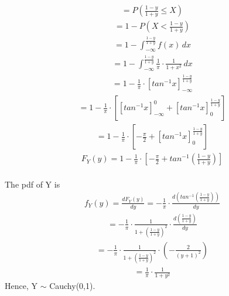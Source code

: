 \documentclass[journal,12pt,twocolumn]{IEEEtran}
\begin{document}
\begin{align}
    = P\left(\frac{1-y}{1+y} \leq X \right)
\end{align}
\begin{align}
    = 1 - P\left(X < \frac{1-y}{1+y}\right)
\end{align}
\begin{align}
    = 1 -  \int_{-\infty}^{\frac{1-y}{1+y}} f(x) \,dx
\end{align}
\begin{align}
    = 1 -  \int_{-\infty}^{\frac{1-y}{1+y}} \frac{1}{\pi}\cdot \frac{1}{1+x^2} \,dx
\end{align}
\begin{align}
    = 1 -  \frac{1}{\pi}\cdot \left[tan^{-1}x\right]_{-\infty}^{\frac{1-y}{1+y}}
\end{align}
\begin{align}
    = 1 -  \frac{1}{\pi}\cdot \left[\left[tan^{-1}x\right]_{-\infty}^{0}+\left[tan^{-1}x\right]_{0}^{\frac{1-y}{1+y}}\right]
\end{align}
\begin{align}
    = 1 -  \frac{1}{\pi}\cdot \left[-\frac{\pi}{2}+\left[tan^{-1}x\right]_{0}^{\frac{1-y}{1+y}}\right]
\end{align}
\begin{align}
    F_{Y}(y) = 1 -  \frac{1}{\pi}\cdot \left[-\frac{\pi}{2}+tan^{-1}\left({\frac{1-y}{1+y}}\right)\right]
\end{align} \\


The pdf of Y is
\begin{align}
    f_{Y}(y) = \frac{d F_{Y}(y)}{dy} = -\frac{1}{\pi}\cdot\frac{d\left(tan^{-1}\left({\frac{1-y}{1+y}}\right)\right)}{dy}
\end{align}
\begin{align}
    = -\frac{1}{\pi}\cdot\frac{1}{1+\left(\frac{1-y}{1+y}\right)^{2}}\cdot\frac{d\left({\frac{1-y}{1+y}}\right)}{dy}
\end{align}
\begin{align}
    = -\frac{1}{\pi}\cdot\frac{1}{1+\left(\frac{1-y}{1+y}\right)^{2}}\cdot\left( -\frac{2}{\left(y + 1\right)^{2}}\right)
\end{align}
\begin{align}
    = \frac{1}{\pi}\cdot \frac{1}{1+y^2}
\end{align}
Hence,  Y $\sim$ Cauchy(0,1).\\
\end{document}
